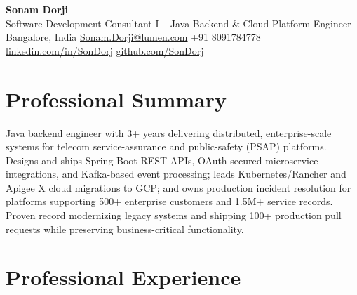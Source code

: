 \documentclass[10pt,a4paper]{article}
\begin{document}
\begin{center}
  {\LARGE \bfseries Sonam Dorji}\\[3pt]
  {\large Software Development Consultant I -- Java Backend \& Cloud Platform Engineer}\\[4pt]
  \small
  Bangalore, India
  \;\textbar\;
  \href{mailto:Sonam.Dorji@lumen.com}{Sonam.Dorji@lumen.com}
  \;\textbar\;
  +91 8091784778
  \;\textbar\;
  \href{https://linkedin.com/in/SonDorj}{linkedin.com/in/SonDorj}
  \;\textbar\;
  \href{https://github.com/SonDorj}{github.com/SonDorj}
\end{center}

\vspace{-4pt}

\section{Professional Summary}
Java backend engineer with 3+ years delivering distributed, enterprise-scale systems for telecom service-assurance and public-safety (PSAP) platforms. Designs and ships Spring Boot REST APIs, OAuth-secured microservice integrations, and Kafka-based event processing; leads Kubernetes/Rancher and Apigee X cloud migrations to GCP; and owns production incident resolution for platforms supporting 500+ enterprise customers and 1.5M+ service records. Proven record modernizing legacy systems and shipping 100+ production pull requests while preserving business-critical functionality.

\section{Professional Experience}
\end{document}
